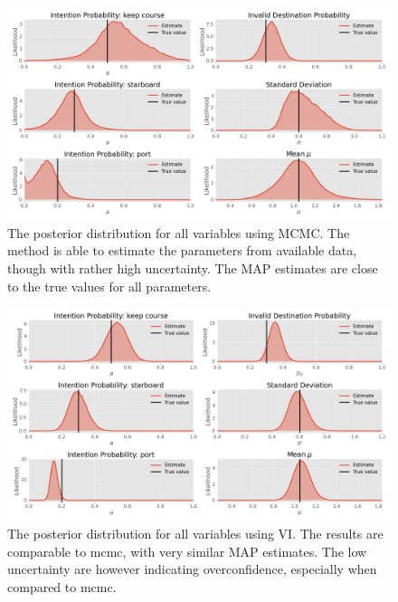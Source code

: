 \begin{figure}[h]
    \centering
    \includegraphics[width=\textwidth]{figures/example_mcmc.png}
    \caption{The posterior distribution for all variables using MCMC. The method is able to estimate the parameters from available data, though with rather high uncertainty. The MAP estimates are close to the true values for all parameters.}
    \label{fig:example_mcmc_posterior}
\end{figure}


\begin{figure}[h]
    \centering
    \includegraphics[width=\textwidth]{figures/example_vi.png}
    \caption{The posterior distribution for all variables using VI. The results are comparable to \acrshort{mcmc}, with very similar MAP estimates. The low uncertainty are however indicating overconfidence, especially when compared to \acrshort{mcmc}.}
    \label{fig:example_vi_posterior}
\end{figure}



